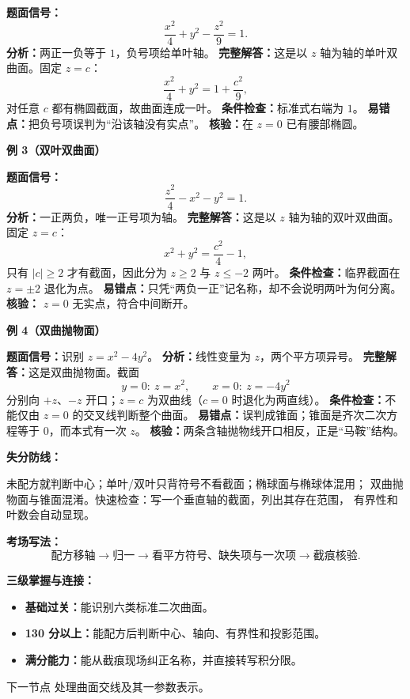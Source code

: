 \begin{knowledgeBox}
\textbf{题面信号：}
\[
\frac{x^2}{4}+y^2-\frac{z^2}{9}=1.
\]
\textbf{分析：}两正一负等于 \(1\)，负号项给单叶轴。
\textbf{完整解答：}这是以 \(z\) 轴为轴的单叶双曲面。固定 \(z=c\)：
\[
\frac{x^2}{4}+y^2=1+\frac{c^2}{9},
\]
对任意 \(c\) 都有椭圆截面，故曲面连成一叶。
\textbf{条件检查：}标准式右端为 \(1\)。
\textbf{易错点：}把负号项误判为“沿该轴没有实点”。
\textbf{核验：}在 \(z=0\) 已有腰部椭圆。

\textbf{例 3（双叶双曲面）}

\textbf{题面信号：}
\[
\frac{z^2}{4}-x^2-y^2=1.
\]
\textbf{分析：}一正两负，唯一正号项为轴。
\textbf{完整解答：}这是以 \(z\) 轴为轴的双叶双曲面。固定 \(z=c\)：
\[
x^2+y^2=\frac{c^2}{4}-1,
\]
只有 \(|c|\ge2\) 才有截面，因此分为 \(z\ge2\) 与 \(z\le-2\) 两叶。
\textbf{条件检查：}临界截面在 \(z=\pm2\) 退化为点。
\textbf{易错点：}只凭“两负一正”记名称，却不会说明两叶为何分离。
\textbf{核验：} \(z=0\) 无实点，符合中间断开。

\textbf{例 4（双曲抛物面）}

\textbf{题面信号：}识别 \(z=x^2-4y^2\)。
\textbf{分析：}线性变量为 \(z\)，两个平方项异号。
\textbf{完整解答：}这是双曲抛物面。截面
\[
y=0:\ z=x^2,\qquad x=0:\ z=-4y^2
\]
分别向 \(+z\)、\(-z\) 开口；\(z=c\) 为双曲线（\(c=0\) 时退化为两直线）。
\textbf{条件检查：}不能仅由 \(z=0\) 的交叉线判断整个曲面。
\textbf{易错点：}误判成锥面；锥面是齐次二次方程等于 \(0\)，而本式有一次 \(z\)。
\textbf{核验：}两条含轴抛物线开口相反，正是“马鞍”结构。

\textbf{失分防线：}

未配方就判断中心；单叶/双叶只背符号不看截面；椭球面与椭球体混用；
双曲抛物面与锥面混淆。快速检查：写一个垂直轴的截面，列出其存在范围，
有界性和叶数会自动显现。

\textbf{考场写法：}
\[
\boxed{\text{配方移轴}\to\text{归一}\to
\text{看平方符号、缺失项与一次项}\to\text{截痕核验}.}
\]

\textbf{三级掌握与连接：}
\begin{itemize}
  \item \textbf{基础过关：}能识别六类标准二次曲面。
  \item \textbf{130 分以上：}能配方后判断中心、轴向、有界性和投影范围。
  \item \textbf{满分能力：}能从截痕现场纠正名称，并直接转写积分限。
\end{itemize}
下一节点 
处理曲面交线及其一参数表示。
\end{knowledgeBox}


